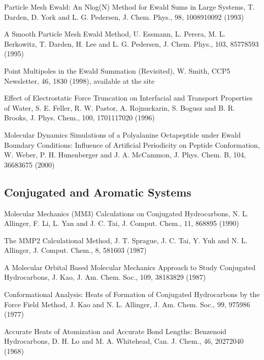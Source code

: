 \documentclass[letterpaper,11pt,english]{sphinxmanual}
\begin{document}
\sphinxAtStartPar
Particle Mesh Ewald: An Nlog(N) Method for Ewald Sums in Large Systems, T. Darden, D. York and L. G. Pedersen, J. Chem. Phys., 98, 10089\sphinxhyphen{}10092 (1993)

\sphinxAtStartPar
A Smooth Particle Mesh Ewald Method, U. Essmann, L. Perera, M. L. Berkowitz, T. Darden, H. Lee and L. G. Pedersen, J. Chem. Phys., 103, 8577\sphinxhyphen{}8593 (1995)

\sphinxAtStartPar
Point Multipoles in the Ewald Summation (Revisited), W. Smith, CCP5 Newsletter, 46, 18\sphinxhyphen{}30 (1998), available at the site 

\sphinxAtStartPar
Effect of Electrostatic Force Truncation on Interfacial and Transport Properties of Water, S. E. Feller, R. W. Pastor, A. Rojnuckarin, S. Bogusz and B. R. Brooks, J. Phys. Chem., 100, 17011\sphinxhyphen{}17020 (1996)

\sphinxAtStartPar
Molecular Dynamics Simulations of a Polyalanine Octapeptide under Ewald Boundary Conditions: Influence of Artificial Periodicity on Peptide Conformation, W. Weber, P. H. Hunenberger and J. A. McCammon, J. Phys. Chem. B, 104, 3668\sphinxhyphen{}3675 (2000)


\subsection{Conjugated and Aromatic Systems}
\label{\detokenize{text/references:conjugated-and-aromatic-systems}}
\sphinxAtStartPar
Molecular Mechanics (MM3) Calculations on Conjugated Hydrocarbons, N. L. Allinger, F. Li, L. Yan and J. C. Tai, J. Comput. Chem., 11, 868\sphinxhyphen{}895 (1990)

\sphinxAtStartPar
The MMP2 Calculational Method, J. T. Sprague, J. C. Tai, Y. Yuh and N. L. Allinger, J. Comput. Chem., 8, 581\sphinxhyphen{}603 (1987)

\sphinxAtStartPar
A Molecular Orbital Based Molecular Mechanics Approach to Study Conjugated Hydrocarbons, J. Kao, J. Am. Chem. Soc., 109, 3818\sphinxhyphen{}3829 (1987)

\sphinxAtStartPar
Conformational Analysis: Heats of Formation of Conjugated Hydrocarbons by the Force Field Method, J. Kao and N. L. Allinger, J. Am. Chem. Soc., 99, 975\sphinxhyphen{}986 (1977)

\sphinxAtStartPar
Accurate Heats of Atomization and Accurate Bond Lengths: Benzenoid Hydrocarbons, D. H. Lo and M. A. Whitehead, Can. J. Chem., 46, 2027\sphinxhyphen{}2040 (1968)
\end{document}
